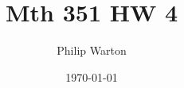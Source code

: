 \documentclass{article}
\begin{document}
\title{Mth 351 HW 4}
\author{Philip Warton}
\date{\today}
\maketitle
\end{document}
